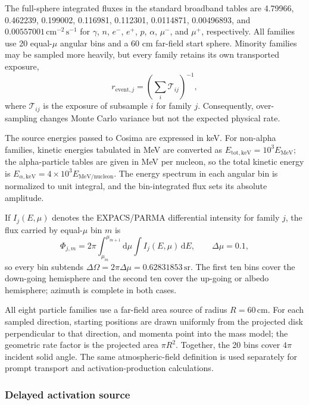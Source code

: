 \documentclass[11pt]{article}
\begin{document}
The full-sphere integrated fluxes in the standard broadband tables are 4.79966, 0.462239, 0.199002,
0.116981, 0.112301, 0.0114871, 0.00496893, and
$0.00557001\,\mathrm{cm^{-2}\,s^{-1}}$ for $\gamma$, $n$, $e^-$, $e^+$, $p$,
$\alpha$, $\mu^-$, and $\mu^+$, respectively. All families use 20 equal-$\mu$
angular bins and a 60 cm far-field start sphere. Minority families may be sampled
more heavily, but every family retains its own transported exposure,
\begin{equation}
  r_{\mathrm{event},j}=\left(\sum_i \mathcal{T}_{ij}\right)^{-1},
\end{equation}
where $\mathcal{T}_{ij}$ is the exposure of subsample $i$ for family $j$.
Consequently, over-sampling changes Monte Carlo variance but not the expected
physical rate.

The source energies passed to Cosima are expressed in keV. For non-alpha
families, kinetic energies tabulated in MeV are converted as
$E_{\mathrm{tot,keV}}=10^3E_{\mathrm{MeV}}$; the alpha-particle tables are given
in MeV per nucleon, so the total kinetic energy is
$E_{\alpha,\mathrm{keV}}=4\times10^3E_{\mathrm{MeV/nucleon}}$. The energy spectrum
in each angular bin is normalized to unit integral, and the bin-integrated flux
sets its absolute amplitude.

If $I_j(E,\mu)$ denotes the EXPACS/PARMA differential intensity for family $j$,
the flux carried by equal-$\mu$ bin $m$ is
\begin{equation}
 \Phi_{j,m}=2\pi\int_{\mu_m}^{\mu_{m+1}}\!\mathrm d\mu
             \int I_j(E,\mu)\,\mathrm dE,
 \qquad \Delta\mu=0.1,
 \label{eq:source_bin_flux}
\end{equation}
so every bin subtends $\Delta\Omega=2\pi\Delta\mu=0.62831853\,\mathrm{sr}$.
The first ten bins cover the down-going hemisphere and the second ten cover the
up-going or albedo hemisphere; azimuth is complete in both cases.

All eight particle families use a far-field area source of radius
$R=60\,\mathrm{cm}$. For each sampled direction, starting positions are drawn
uniformly from the projected disk perpendicular to that direction, and momenta
point into the mass model; the geometric rate factor is the projected area
$\pi R^2$. Together, the 20 bins cover $4\pi$ incident solid angle. The same
atmospheric-field definition is used separately for prompt transport and
activation-production calculations.

\subsubsection{Delayed activation source}
\label{subsec:delayed_source}
\end{document}
